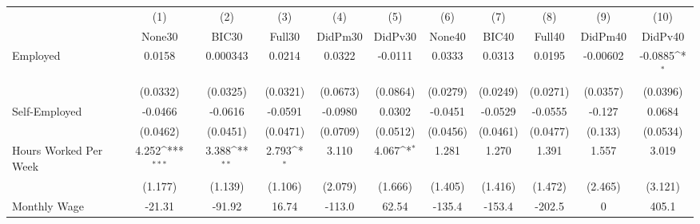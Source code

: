 {
\def\sym#1{\ifmmode^{#1}\else\(^{#1}\)\fi}
\begin{tabular}{l*{10}{c}}
\toprule
            &\multicolumn{1}{c}{(1)}&\multicolumn{1}{c}{(2)}&\multicolumn{1}{c}{(3)}&\multicolumn{1}{c}{(4)}&\multicolumn{1}{c}{(5)}&\multicolumn{1}{c}{(6)}&\multicolumn{1}{c}{(7)}&\multicolumn{1}{c}{(8)}&\multicolumn{1}{c}{(9)}&\multicolumn{1}{c}{(10)}\\
            &\multicolumn{1}{c}{None30}&\multicolumn{1}{c}{BIC30}&\multicolumn{1}{c}{Full30}&\multicolumn{1}{c}{DidPm30}&\multicolumn{1}{c}{DidPv30}&\multicolumn{1}{c}{None40}&\multicolumn{1}{c}{BIC40}&\multicolumn{1}{c}{Full40}&\multicolumn{1}{c}{DidPm40}&\multicolumn{1}{c}{DidPv40}\\
\midrule
Employed    &      0.0158         &    0.000343         &      0.0214         &      0.0322         &     -0.0111         &      0.0333         &      0.0313         &      0.0195         &    -0.00602         &     -0.0885\sym{*}  \\
            &    (0.0332)         &    (0.0325)         &    (0.0321)         &    (0.0673)         &    (0.0864)         &    (0.0279)         &    (0.0249)         &    (0.0271)         &    (0.0357)         &    (0.0396)         \\
\addlinespace
Self-Employed&     -0.0466         &     -0.0616         &     -0.0591         &     -0.0980         &      0.0302         &     -0.0451         &     -0.0529         &     -0.0555         &      -0.127         &      0.0684         \\
            &    (0.0462)         &    (0.0451)         &    (0.0471)         &    (0.0709)         &    (0.0512)         &    (0.0456)         &    (0.0461)         &    (0.0477)         &     (0.133)         &    (0.0534)         \\
\addlinespace
Hours Worked Per Week&       4.252\sym{***}&       3.388\sym{**} &       2.793\sym{*}  &       3.110         &       4.067\sym{*}  &       1.281         &       1.270         &       1.391         &       1.557         &       3.019         \\
            &     (1.177)         &     (1.139)         &     (1.106)         &     (2.079)         &     (1.666)         &     (1.405)         &     (1.416)         &     (1.472)         &     (2.465)         &     (3.121)         \\
\addlinespace
Monthly Wage&      -21.31         &      -91.92         &       16.74         &      -113.0         &       62.54         &      -135.4         &      -153.4         &      -202.5         &           0         &       405.1         \\

\end{tabular}}
